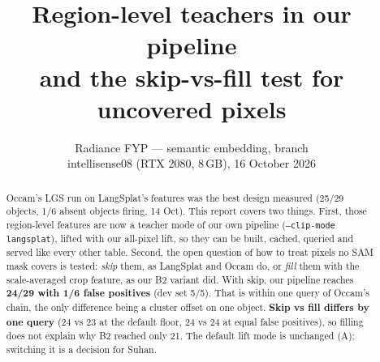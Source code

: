 \documentclass[11pt,a4paper]{article}
\title{\textbf{Region-level teachers in our pipeline}\\[2pt]
\large \code{--clip-mode langsplat} and the skip-vs-fill test for uncovered pixels}
\author{Radiance FYP --- semantic embedding, branch \code{semantic/new}\\ \small intellisense08 (RTX 2080, 8\,GB), 16 October 2026}
\date{}
\newcommand{\code}[1]{\texttt{\small #1}}
\begin{document}
\maketitle

\begin{abstract}
\noindent Occam's LGS run on LangSplat's features was the best design measured (25/29 objects, 1/6 absent objects firing,
14 Oct). This report covers two things. First, those region-level features are now a teacher mode of our own pipeline
(\code{--clip-mode langsplat}), lifted with our all-pixel lift, so they can be built, cached, queried and served like
every other table. Second, the open question of how to treat pixels no SAM mask covers is tested: \emph{skip} them, as
LangSplat and Occam do, or \emph{fill} them with the scale-averaged crop feature, as our B2 variant did. With skip, our
pipeline reaches \textbf{24/29 with 1/6 false positives} (dev set 5/5). That is within one query of Occam's chain, the
only difference being a cluster offset on one object. \textbf{Skip vs fill differs by one query} (24 vs 23 at the default
floor, 24 vs 24 at equal false positives), so filling does not explain why B2 reached only 21. The default lift mode is
unchanged (A); switching it is a decision for Suhan.
\end{abstract}
\end{document}
